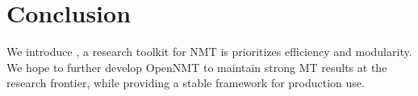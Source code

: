 \documentclass[11pt]{article}
\begin{document}

\section{Conclusion}

We introduce , a research toolkit for NMT is
prioritizes efficiency and modularity. We hope to further develop
OpenNMT to maintain strong MT results at the research frontier, while
providing a stable framework for production use.


 





\end{document}

